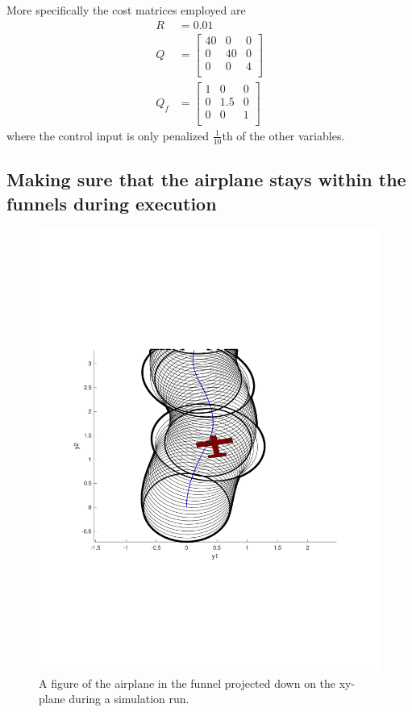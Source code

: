 More specifically the cost matrices employed are
\begin{align*}
  R &= 0.01 \\
  Q &= \begin{bmatrix}
    40 & 0 & 0  \\
    0 & 40 & 0  \\
    0 & 0 & 4   \\
  \end{bmatrix}
  \\
  Q_{f} &=
          \begin{bmatrix}
            1 & 0 & 0   \\
            0 & 1.5 & 0  \\
            0 & 0 & 1   \\
          \end{bmatrix}
\end{align*}
where the control input is only penalized \(\frac{1}{10}\)th of the other
variables.

\subsection{Making sure that the airplane stays within the funnels during
  execution}
\label{subsec:check-vehicle-in-funnel}

\begin{figure}
  \centering \includegraphics[scale=.5, trim={2cm 6cm 2cm
    6cm}]{figures/experiments/airplane-in-funnel} \caption{A figure of the
    airplane in the funnel projected down on the xy-plane during a simulation
    run.}
\end{figure}

